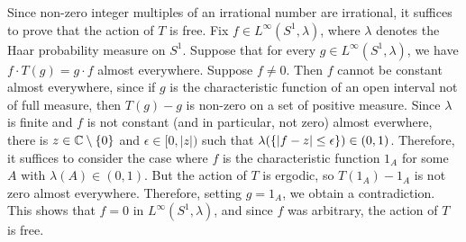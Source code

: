 \documentclass[a4paper,10pt]{report}
\DeclarePairedDelimiter{\set}{\{}{\}}
\newcommand{\C}{\mathbb{C}}
\begin{document}
\begin{enumerate}
																Since non-zero integer multiples of an irrational number are irrational, it suffices to prove that the action of $T$ is free. Fix $f\in L^\infty(S^1,\lambda)$, where $\lambda$ denotes the Haar probability measure on $S^1$. Suppose that for every $g\in L^\infty(S^1,\lambda)$, we have $f\cdot T(g)=g\cdot f$ almost everywhere. Suppose $f\neq 0$. Then $f$ cannot be constant almost everywhere, since if $g$ is the characteristic function of an open interval not of full measure, then $T(g)-g$ is non-zero on a set of positive measure. Since $\lambda$ is finite and $f$ is not constant (and in particular, not zero) almost everwhere, there is $z\in\C\setminus\set{0}$ and $\epsilon\in[0,|z|)$ such that $\lambda(\set{|f-z|\le\epsilon})\in(0,1)$. Therefore, it suffices to consider the case where $f$ is the characteristic function $1_A$ for some $A$ with $\lambda(A)\in(0,1)$. But the action of $T$ is ergodic, so $T(1_A)-1_A$ is not zero almost everywhere. Therefore, setting $g=1_A$, we obtain a contradiction. This shows that $f=0$ in $L^\infty(S^1,\lambda)$, and since $f$ was arbitrary, the action of $T$ is free. 







\end{enumerate}
\end{document}
